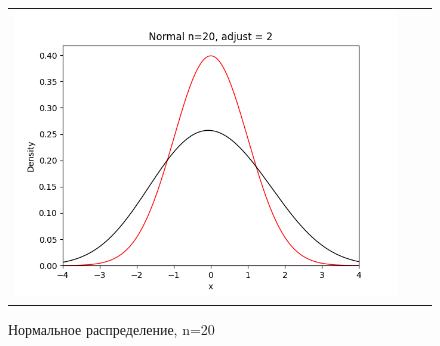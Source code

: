\begin{figure}[H]
\begin{tabular}{ccc}
		\includegraphics[scale=0.33]{normal_n20_adjust2.png}
	\end{tabular}
	\caption{Нормальное распределение, n=20}
\end{figure}

